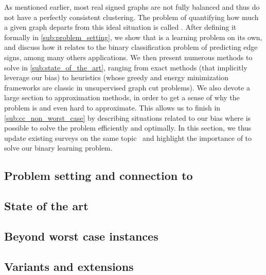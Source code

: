 As mentioned earlier, most real signed graphs are not fully balanced and thus do not have a
perfectly consistent clustering. The problem of quantifying how much a given graph departs from this
ideal situation is called \pcc{}. After defining it formally in \autoref{sub:problem_setting}, we
show that \pcc{} is a learning problem on its own, and discuss how it relates to the binary
classification problem of predicting edge signs, among many others applications. We then present
numerous methods to solve \pcc{} in \autoref{sub:state_of_the_art}, ranging from exact methods (that
implicitly leverage our bias) to heuristics (whose greedy and energy minimization frameworks are
classic in unsupervised graph cut problems). We also devote a large section to approximation
methods, in order to get a sense of why the problem is \NPc{} and even hard to approximate. This
allows us to finish in
\autoref{sub:cc_non_worst_case} by describing situations related to our bias where is possible to
solve the problem efficiently and optimally. In this section, we thus update existing surveys on the same
topic~\autocites{bonchi2014correlation}{surveyCC16}{CCWirth2017} and highlight the importance of
\pcc{} to solve our binary learning problem.


\subsection{Problem setting and connection to \esp{}}
\label{sub:problem_setting}


\subsection{State of the art}
\label{sub:state_of_the_art}



\subsection{Beyond worst case instances}
\label{sub:cc_non_worst_case}



\begin{aside}
\subsection{Variants and extensions}
\label{sub:variants_and_extensions}

\end{aside}
